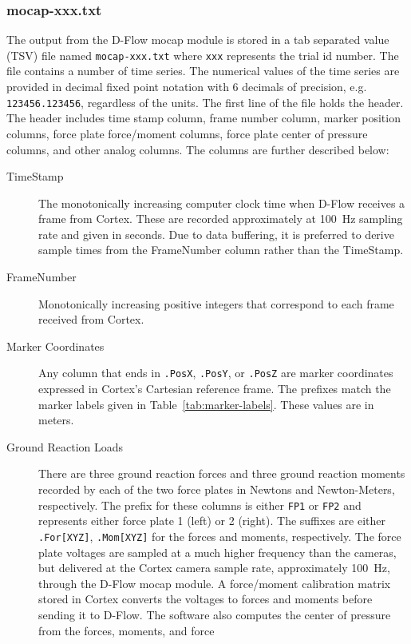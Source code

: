 \documentclass[fleqn,12pt]{wlpeerj}
\begin{document}
\subsubsection*{mocap-xxx.txt}
%
The output from the D-Flow mocap module is stored in a tab separated value
(TSV) file named \verb+mocap-xxx.txt+ where \verb+xxx+ represents the trial id
number. The file contains a number of time series. The numerical values of the
time series are provided in decimal fixed point notation with 6 decimals of
precision, e.g. \verb|123456.123456|, regardless of the units. The first line
of the file holds the header. The header includes time stamp column, frame
number column, marker position columns, force plate force/moment columns, force
plate center of pressure columns, and other analog columns. The columns are
further described below:
%
\begin{description}
  \item[TimeStamp] The monotonically increasing computer clock time when D-Flow
    receives a frame from Cortex. These are recorded approximately at
    100~\si{\hertz} sampling rate and given in seconds. Due to data buffering,
    it is preferred to derive sample times from the FrameNumber column rather
    than the TimeStamp.
  \item[FrameNumber] Monotonically increasing positive integers that correspond
    to each frame received from Cortex.
  \item[Marker Coordinates] Any column that ends in \verb+.PosX+, \verb+.PosY+,
    or \verb+.PosZ+ are marker coordinates expressed in Cortex's Cartesian
    reference frame. The prefixes match the marker labels given in
    Table~\ref{tab:marker-labels}. These values are in meters.
  \item[Ground Reaction Loads] There are three ground reaction forces and three
    ground reaction moments recorded by each of the two force plates in Newtons
    and Newton-Meters, respectively. The prefix for these columns is either
    \verb+FP1+ or \verb+FP2+ and represents either force plate 1 (left) or 2
    (right). The suffixes are either \verb+.For[XYZ]+, \verb+.Mom[XYZ]+ for the
    forces and moments, respectively. The force plate voltages are sampled at a
    much higher frequency than the cameras, but delivered at the Cortex camera
    sample rate, approximately 100~\si{\hertz}, through the D-Flow mocap
    module. A force/moment calibration matrix stored in Cortex converts the
    voltages to forces and moments before sending it to D-Flow. The software
    also computes the center of pressure from the forces, moments, and force

\end{description}
\end{document}
